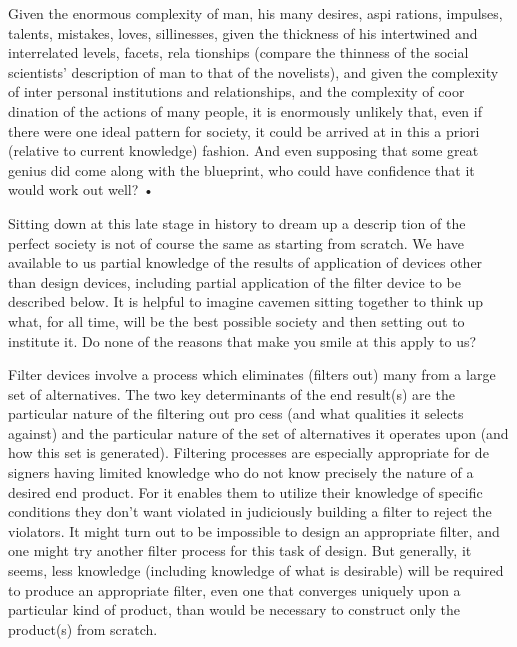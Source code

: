 \documentclass[11pt,openany]{book}
\begin{document}
Given the enormous complexity of man, his many desires, aspi rations, impulses, talents, mistakes, loves, sillinesses, given the thickness of his intertwined and interrelated levels, facets, rela tionships (compare the thinness of the social scientists' description of man to that of the novelists), and given the complexity of inter personal institutions and relationships, and the complexity of coor dination of the actions of many people, it is enormously unlikely that, even if there were one ideal pattern for society, it could be arrived at in this a priori (relative to current knowledge) fashion. And even supposing that some great genius did come along with the blueprint, who could have confidence that it would work out well? • 

Sitting down at this late stage in history to dream up a descrip tion of the perfect society is not of course the same as starting from scratch. We have available to us partial knowledge of the results of application of devices other than design devices, including partial application of the filter device to be described below. It is helpful to imagine cavemen sitting together to think up what, for all time, will be the best possible society and then setting out to institute it. Do none of the reasons that make you smile at this apply to us? 

Filter devices involve a process which eliminates (filters out) many from a large set of alternatives. The two key determinants of the end result(s) are the particular nature of the filtering out pro cess (and what qualities it selects against) and the particular nature of the set of alternatives it operates upon (and how this set is generated). Filtering processes are especially appropriate for de signers having limited knowledge who do not know precisely the nature of a desired end product. For it enables them to utilize their knowledge of specific conditions they don't want violated in judiciously building a filter to reject the violators. It might turn out to be impossible to design an appropriate filter, and one might try another filter process for this task of design. But generally, it seems, less knowledge (including knowledge of what is desirable) will be required to produce an appropriate filter, even one that converges uniquely upon a particular kind of product, than would be necessary to construct only the product(s) from scratch. 
\end{document}
